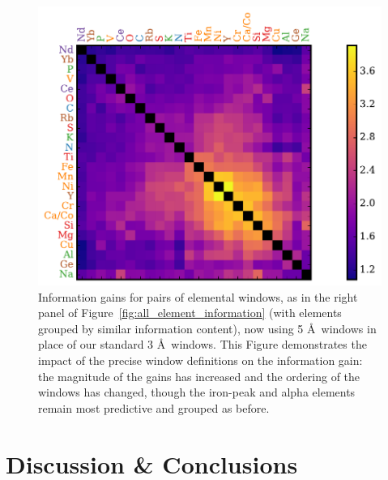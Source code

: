 \documentclass[a4paper,fleqn,usenatbib]{mnras}
\begin{document}
\begin{figure}
	\includegraphics[width=\columnwidth]{apogee_centers_final_29502_spc_sorted_inf_gains_abs_min_tot_dist.pdf}
    \caption{Information gains for pairs of elemental windows, as in the right panel of  Figure~\ref{fig:all_element_information} (with elements grouped by similar information content), now using 5 \AA\ windows in place of our standard 3 \AA\ windows. This Figure demonstrates the impact of the precise window definitions on the information gain: the magnitude of the gains has increased and the ordering of the windows has changed, though the iron-peak and alpha elements remain most predictive and grouped as before.}
    \label{fig:all_element_information_wide}
\end{figure}




\section{Discussion \& Conclusions}
\label{sec:discussion}
\end{document}
